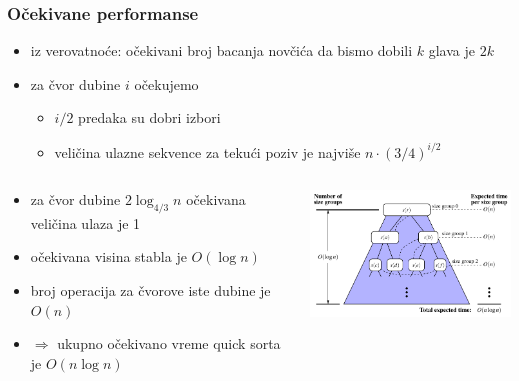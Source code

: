 \documentclass[compress]{beamer}
\begin{document}
\begin{frame}[fragile]
  \frametitle{Očekivane performanse}
  \begin{itemize}
    \item iz verovatnoće: očekivani broj bacanja novčića da bismo dobili $k$ glava je $2k$
    \item za čvor dubine $i$ očekujemo
    \begin{itemize}
      \item $i/2$ predaka su dobri izbori
      \item veličina ulazne sekvence za tekući poziv je najviše $n\cdot (3/4)^{i/2}$
    \end{itemize}
  \end{itemize}
  \begin{columns}
    \begin{column}[t]{5cm}
      {\scriptsize
      \begin{itemize}
        \item za čvor dubine $2\log_{4/3}n$ očekivana veličina ulaza je 1
        \item očekivana visina stabla je $O(\log n)$
        \item broj operacija za čvorove iste dubine je $O(n)$
        \item $\Rightarrow$ ukupno očekivano vreme quick sorta je $O(n\log n)$ 
      \end{itemize}
      }
    \end{column}
    \begin{column}[t]{7cm}
      \begin{center}
        \includegraphics[width=7cm]{asp-12-pic26.pdf}
      \end{center}
    \end{column}
  \end{columns}
\end{frame}
\end{document}
